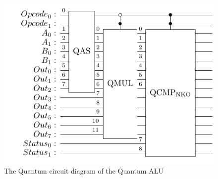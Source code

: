 \begin{figure}[!ht]
    \centering
    \includegraphics{images/6_Complete_System/qalu_complete.pdf}
    \caption{The Quantum circuit diagram of the Quantum ALU}
\end{figure}